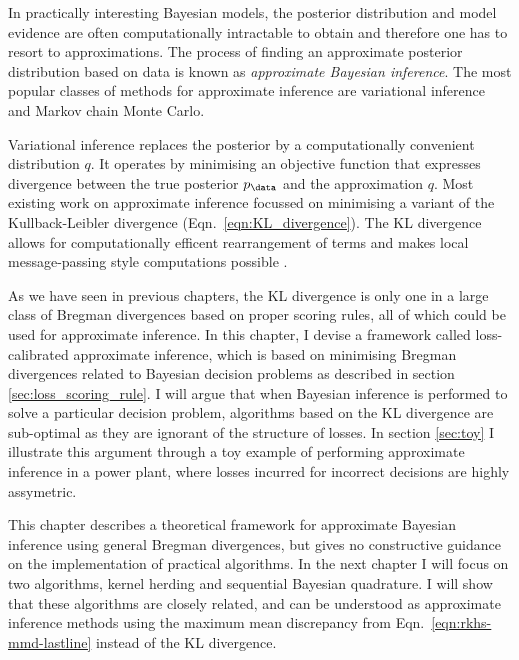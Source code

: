 In practically interesting Bayesian models, the posterior distribution and model evidence are often computationally intractable to obtain and therefore one has to resort to approximations. The process of finding an approximate posterior distribution based on data is known as \emph{approximate Bayesian inference}. The most popular classes of methods for approximate inference are variational inference and Markov chain Monte Carlo.

Variational inference replaces the posterior by a computationally convenient distribution $q$. It operates by minimising an objective function that expresses divergence between the true posterior $p_\data$ and the approximation $q$. Most existing work on approximate inference focussed on minimising a variant of the Kullback-Leibler divergence (Eqn.\ \eqref{eqn:KL_divergence}). The KL divergence allows for computationally efficent rearrangement of terms and makes local message-passing style computations possible \citep{Minka2001,Winn2006}.

As we have seen in previous chapters, the KL divergence is only one in a large class of Bregman divergences based on proper scoring rules, all of which could be used for approximate inference. In this chapter, I devise a framework called loss-calibrated approximate inference, which is based on minimising Bregman divergences related to Bayesian decision problems as described in section \ref{sec:loss_scoring_rule}. I will argue that when Bayesian inference is performed to solve a particular decision problem, algorithms based on the KL divergence are sub-optimal as they are ignorant of the structure of losses. In section \ref{sec:toy} I illustrate this argument through a toy example of performing approximate inference in a power plant, where losses incurred for incorrect decisions are highly assymetric.

This chapter describes a theoretical framework for approximate Bayesian inference using general Bregman divergences, but gives no constructive guidance on the implementation of practical algorithms. In the next chapter I will focus on two algorithms, kernel herding and sequential Bayesian quadrature. I will show that these algorithms are closely related, and can be understood as approximate inference methods using the maximum mean discrepancy from Eqn.\ \eqref{eqn:rkhs-mmd-lastline} instead of the KL divergence.


